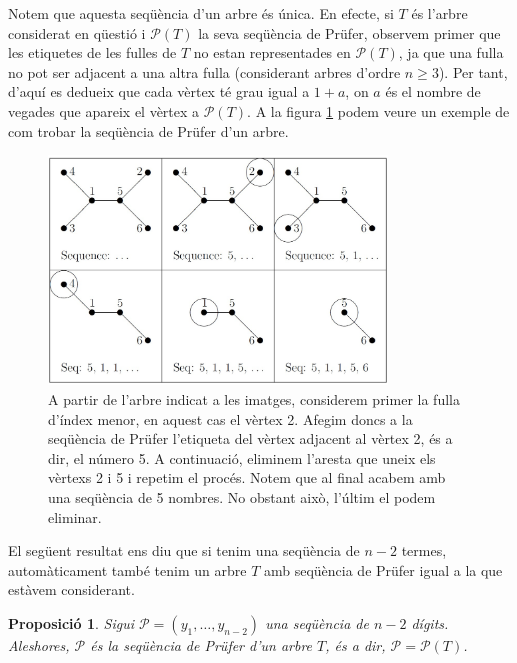 \documentclass{article}
\newtheorem{prop}{Proposició}[section]
\begin{document}
Notem que aquesta seqüència d'un arbre és única. En efecte, si $T$ és l'arbre considerat en qüestió i $\mathcal{P}(T)$ la seva seqüència de Prüfer, observem primer que les etiquetes de les fulles de $T$ no estan representades en $\mathcal{P}(T)$, ja que una fulla no pot ser adjacent a una altra fulla (considerant arbres d'ordre $n\geq 3$). Per tant, d'aquí es dedueix que cada vèrtex té grau igual a $1+a$, on $a$ és el nombre de vegades que apareix el vèrtex a $\mathcal{P}(T)$. A la figura \ref{pruf1} podem veure un exemple de com trobar la seqüència de Prüfer d'un arbre.\par \begin{figure}[H]
    \centering
    \includegraphics[width=9cm]{Imatges/prufer1.jpg}
    \caption{A partir de l'arbre indicat a les imatges, considerem primer la fulla d'índex menor, en aquest cas el vèrtex 2. Afegim doncs a la seqüència de Prüfer l'etiqueta del vèrtex adjacent al vèrtex 2, és a dir, el número 5. A continuació, eliminem l'aresta que uneix els vèrtexs 2 i 5 i repetim el procés. Notem que al final acabem amb una seqüència de 5 nombres. No obstant això, l'últim el podem eliminar. \cite{3}}
    \label{pruf1}
\end{figure}
El següent resultat ens diu que si tenim una seqüència de $n-2$ termes, automàticament també tenim un arbre $T$ amb seqüència de Prüfer igual a la que estàvem considerant.
\begin{prop}
    Sigui $\mathcal{P}=(y_1,\ldots,y_{n-2})$ una seqüència de $n-2$ dígits. Aleshores, $\mathcal{P}$ és la seqüència de Prüfer d'un arbre $T$, és a dir, $\mathcal{P}=\mathcal{P}(T)$.
\end{prop}
\end{document}
